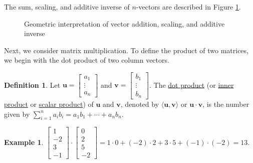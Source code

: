 \documentclass[12pt,letterpaper]{book}
\numberwithin{equation}{section}
\theoremstyle{definition}
\newtheorem{defi}[thm]{\textbf{Definition}}
\newtheorem{example}[thm]{\textbf{Example}}
\newcommand{\vu}{\bm{u}}
\newcommand{\vv}{\bm{v}}
\newcommand{\veczero}{\bm{0}}
\begin{document}
The sum, scaling, and additive inverse of $n$-vectors are described in Figure \ref{geometric addition}.

\begin{figure}[h]
\begin{center}
\end{center}
\caption{Geometric interpretation of vector addition, scaling, and additive inverse}
\label{geometric addition}
\end{figure}

Next, we consider matrix multiplication. To define the product of two matrices, we begin with the dot product of two column vectors.

\begin{defi} Let $\vu=\left[\begin{array}{c} a_1 \\ \vdots
\\ a_n \end{array}\right]$ and $\vv=\left[\begin{array}{c} b_1 \\ \vdots
\\ b_n \end{array}\right]$. The \underline{dot product} (or \underline{inner product} or \underline{scalar
product}) of $\vu$ and $\vv$, denoted by $\langle \vu,\vv\rangle$ or $\vu\cdot\vv$, is the
number given by $\sum_{i=1}^n a_ib_i=a_1b_1+\cdots+a_nb_n$.
\end{defi}

\begin{example}$\left[\begin{array}{r} 1 \\ -2 \\ 3 \\ -1
\end{array}\right]\cdot \left[\begin{array}{r} 0 \\ 2 \\ 5 \\ -2
\end{array}\right]=1\cdot 0 + (-2)\cdot 2 + 3\cdot 5 + (-1)\cdot (-2) =13$.
\end{example}
\end{document}

